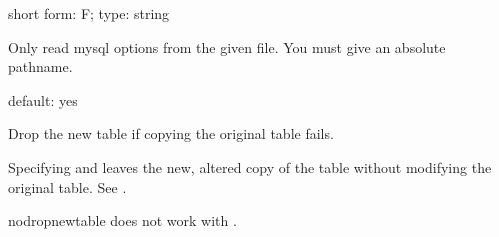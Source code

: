 \documentclass[letterpaper,10pt,english]{sphinxmanual}
\begin{document}
\begin{fulllineitems}
\label{\detokenize{mariadb-schema-change:cmdoption-mariadb-schema-change-defaults-file}}
\sphinxAtStartPar
short form: \sphinxhyphen{}F; type: string

\sphinxAtStartPar
Only read mysql options from the given file.  You must give an absolute
pathname.

\end{fulllineitems}


\begin{fulllineitems}
\label{\detokenize{mariadb-schema-change:cmdoption-mariadb-schema-change-no-drop-new-table}}
\sphinxAtStartPar
default: yes

\sphinxAtStartPar
Drop the new table if copying the original table fails.

\sphinxAtStartPar
Specifying  and  leaves the new,
altered copy of the table without modifying the original table.  See
{\hyperref[\detokenize{mariadb-schema-change:cmdoption-mariadb-schema-change-new-table-name}]{}}.

\sphinxAtStartPar
\textendash{}no\sphinxhyphen{}drop\sphinxhyphen{}new\sphinxhyphen{}table does not work with
.

\end{fulllineitems}
\end{document}
